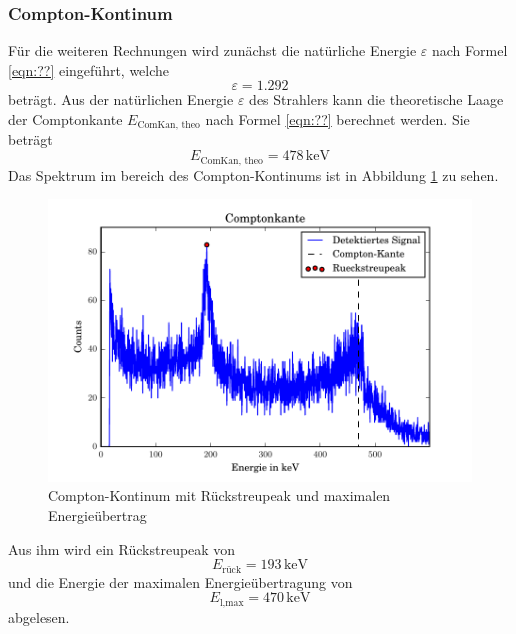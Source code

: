 \subsubsection{Compton-Kontinum}
Für die weiteren Rechnungen wird zunächst die natürliche Energie $\varepsilon$ nach Formel \ref{eqn:??} eingeführt, welche
\begin{equation}
  \varepsilon = 1.292
  \label{eqn:nE}
\end{equation}
beträgt. Aus der natürlichen Energie $\varepsilon$ des Strahlers kann die theoretische Laage der Comptonkante $E_\text{ComKan, theo}$ nach Formel \ref{eqn:??} berechnet werden. Sie beträgt
\begin{equation}
  E_\text{ComKan, theo} = 478 \, \text{keV}
  \label{eqn:KanTheo}
\end{equation}
Das Spektrum im bereich des Compton-Kontinums ist in Abbildung \ref{fig:Compt} zu sehen.
\begin{figure}[htpb]
  \centering
  \includegraphics[width=\textwidth]{./build/Compton.pdf}
  \caption{Compton-Kontinum mit Rückstreupeak und maximalen Energieübertrag}
  \label{fig:Compt}
\end{figure}
Aus ihm wird ein Rückstreupeak von
\begin{equation}
  E_\text{rück} = 193 \, \text{keV}
  \label{eqn:KanExp}
\end{equation}
und die Energie der maximalen Energieübertragung von
\begin{equation}
  E_\text{l,max} = 470 \, \text{keV}
  \label{eqn:RückExp}
\end{equation}
abgelesen.
